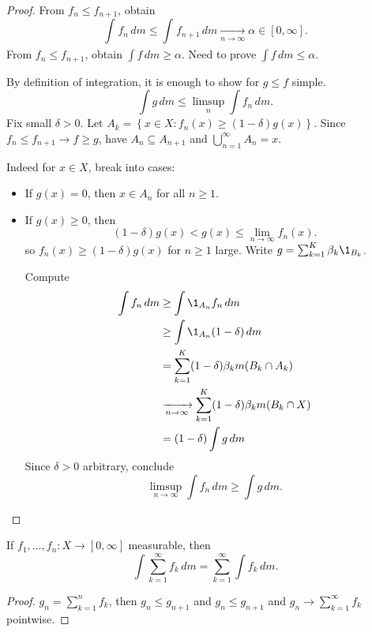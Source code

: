 \begin{proof}
	From $f_n \leq f_{n+1}$, obtain
	\[
		\int_{}^{} f_n \,dm \leq \int_{}^{} f_{n+1} \,dm \xrightarrow[n \to \infty]{} \alpha \in [0, \infty].
	\]
	From $f_n \leq f_{n+1}$, obtain $\int f \, dm \geq \alpha$. Need to prove $\int f \, dm \leq \alpha$.

	By definition of integration, it is enough to show for $g \leq f$ simple.
	\[
		\int g \, dm \leq \limsup_{n} \int f_n \, dm.
	\]
	Fix small $\delta > 0$. Let $A_k = \left\{x \in X : f_n(x) \geq (1 - \delta) g(x) \right\}$.
	Since $f_n \leq f_{n+1} \to f \geq g$, have $A_n \subseteq A_{n+1}$ and $\bigcup_{n=1}^{\infty} A_n = x$.

	Indeed for $x \in X$, break into cases:
	\begin{itemize}
		\item If $g(x) = 0$, then $x \in A_n$ for all $n \geq 1$.
		\item If $g(x) \geq 0$, then
			\[
				(1 - \delta) g(x) < g(x) \leq \lim_{n \to \infty} f_n (x).
			\]
		so $f_n(x) \geq (1 - \delta) g(x)$ for $n \geq 1$ large. Write $g = \sum_{k = 1}^{K} \beta_k \1_{B_k}$.

		Compute
		\begin{align*}
			\int f_n \, dm & \geq \int \1_{A_n} f_n \, dm \\
										 & \geq \int \1_{A_n} (1 - \delta) \, dm \\
										 & = \sum_{k = 1}^{K} (1 - \delta) \beta_k m(B_k \cap A_k) \\
										 & \xrightarrow[n \to \infty]{} \sum_{k = 1}^{K} (1 - \delta) \beta_k m(B_k \cap X) \\
										 & = (1 - \delta) \int g \, dm
		\end{align*}
		Since $\delta > 0$ arbitrary, conclude
		\[
			\limsup_{n \to \infty} \int f_n \, dm \geq \int g \, dm.
		\]
	\end{itemize}
\end{proof}

\begin{corollary}
	If $f_1, \ldots, f_n : X \to [0, \infty]$ measurable, then
	\[
		 \int \sum_{k = 1}^{\infty} f_k \, dm = \sum_{k = 1}^{\infty} \int f_k \, dm.
	\]
\end{corollary}

\begin{proof}
	$g_n = \sum_{k = 1}^{n} f_k$, then $g_n \leq g_{n+1}$ and $g_n \leq g_{n+1}$ and $g_n \to \sum_{k = 1}^{\infty} f_k$ pointwise.
\end{proof}

